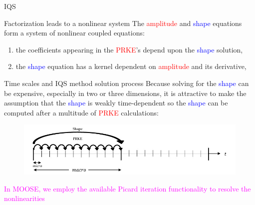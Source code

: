 \documentclass[8pt]{beamer}
\newcommand{\ben}{\begin{enumerate}}
\newcommand{\een}{\end{enumerate}}
\newcommand{\tcr}[1]{\textcolor{red}{#1}}
\newcommand{\tcb}[1]{\textcolor{blue}{#1}}
\newcommand{\tcm}[1]{\textcolor{magenta}{#1}}
\begin{document}
\begin{frame}{IQS}

\begin{block}{Factorization leads to a nonlinear system}
The \tcr{amplitude} and \tcb{shape} equations form a system of nonlinear coupled equations: 
\ben
\item the coefficients appearing in the \tcr{PRKE}'s depend upon the \tcb{shape} solution,
\item the \tcb{shape} equation has a kernel dependent on \tcr{amplitude} and its derivative,  
\een
\end{block}

\begin{block}{Time scales and IQS method solution process}
Because solving for the \tcb{shape} can be expensive, especially in two or three dimensions, it is attractive to make the assumption that the \tcb{shape} is weakly time-dependent so the \tcb{shape} can be computed after a multitude of \tcr{PRKE} calculations:
%

\begin{figure}[h]
\includegraphics[width=\linewidth]{figures/IQS_visualization.jpg}
\label{fig:IQS}
\end{figure}

\tcm{In MOOSE, we employ the available Picard iteration functionality to resolve the nonlinearities}
\end{block}
\end{frame}
\end{document}
